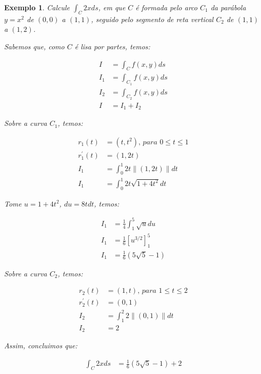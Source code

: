 \documentclass{article}
\newcommand{\norm}[1] {\left.\parallel #1 \right.\parallel}
\newtheorem{example}{Exemplo}[section]
\begin{document}
        \begin{example}
            Calcule $\int_C 2x ds$, em que $C$ é formada pelo arco $C_1$ da parábola $y = x^2$ de
            $(0, 0)$ a $(1, 1)$, seguido pelo segmento de reta vertical $C_2$ de $(1, 1)$ a $(1, 2)$.

            Sabemos que, como $C$ é lisa por partes, temos:
            
            \begin{align*}
                I &= \int_C f(x,y) ds\\
                I_1 &= \int_{C_1} f(x,y) ds\\
                I_2 &= \int_{C_2} f(x,y) ds\\
                I &= I_1 + I_2
            \end{align*}

            Sobre a curva $C_1$, temos:

            \begin{align*}
                r_1(t) &= (t, t^2) \textit{, para } 0 \leq t \leq 1\\
                r_1^\prime(t) &= (1, 2t)\\
                I_1 &= \int_0^1 2t \norm{(1, 2t)} dt\\
                I_1 &= \int_0^1 2t \sqrt{1 + 4t^2} dt
            \end{align*}

            Tome $u = 1 + 4t^2$, $du = 8t dt$, temos:
            
            \begin{align*}
                I_1 &= \frac{1}{4} \int_1^5 \sqrt{u} du\\
                I_1 &= \frac{1}{6} \left[ u^{3/2} \right]_1^5\\
                I_1 &= \frac{1}{6} (5 \sqrt{5} - 1)
            \end{align*}

            Sobre a curva $C_2$, temos:

            \begin{align*}
                r_2 (t) &= (1, t) \textit{, para } 1 \leq t \leq 2\\
                r_2^\prime (t) &= (0, 1)\\
                I_2 &= \int_1^2 2 \norm{(0, 1)} dt\\
                I_2 &= 2
            \end{align*}

            Assim, concluimos que:

            \begin{align*}
                \int_C 2x ds &= \frac{1}{6} (5 \sqrt{5} - 1) + 2
            \end{align*}
        \end{example}
\end{document}
